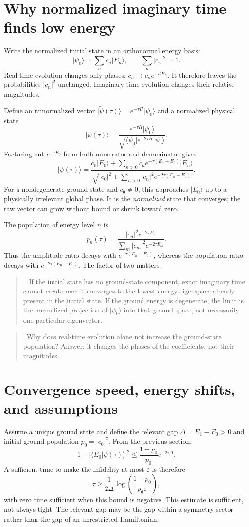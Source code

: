 \documentclass[11pt,a4paper]{article}
\newcommand{\ket}[1]{\lvert #1\rangle}
\newcommand{\bra}[1]{\langle #1\rvert}
\newcommand{\braket}[2]{\langle #1\vert #2\rangle}
\newcommand{\lesson}[2]{\clearpage\section{#1}\label{#2}}
\newenvironment{idea}[1][Main idea]{\par\smallskip\begin{quotation}\noindent{\bfseries\textcolor{keyblue}{#1.}}\ }{\end{quotation}\smallskip}
\newenvironment{caution}[1][Important distinction]{\par\smallskip\begin{quotation}\noindent{\bfseries\textcolor{alertred}{#1.}}\ }{\end{quotation}\smallskip}
\newcommand{\checkpoint}[1]{\begin{idea}[Pause and check]#1\end{idea}}
\begin{document}
\lesson{Why normalized imaginary time finds low energy}{sec:filter}
Write the normalized initial state in an orthonormal energy basis:
\[
\ket{\psi_0}=\sum_n c_n\ket{E_n},\qquad \sum_n|c_n|^2=1.
\]
Real-time evolution changes only phases: $c_n\mapsto c_ne^{-itE_n}$. It therefore leaves the probabilities $|c_n|^2$ unchanged. Imaginary-time evolution changes their relative magnitudes.

Define an unnormalized vector $\ket{\widetilde\psi(\tau)}=e^{-\tau H}\ket{\psi_0}$ and a normalized physical state
\begin{equation}
\boxed{\ket{\psi(\tau)}=
\frac{e^{-\tau H}\ket{\psi_0}}
{\sqrt{\bra{\psi_0}e^{-2\tau H}\ket{\psi_0}}}.}
\label{eq:normalized}
\end{equation}
Factoring out $e^{-\tau E_0}$ from both numerator and denominator gives
\[
\ket{\psi(\tau)}=
\frac{c_0\ket{E_0}+\sum_{n>0}c_ne^{-\tau(E_n-E_0)}\ket{E_n}}
{\sqrt{|c_0|^2+\sum_{n>0}|c_n|^2e^{-2\tau(E_n-E_0)}}}.
\]
For a nondegenerate ground state and $c_0\ne0$, this approaches $\ket{E_0}$ up to a physically irrelevant global phase. It is the \emph{normalized} state that converges; the raw vector can grow without bound or shrink toward zero.

The population of energy level $n$ is
\[
p_n(\tau)=\frac{|c_n|^2e^{-2\tau E_n}}{\sum_m |c_m|^2e^{-2\tau E_m}}.
\]
Thus the amplitude ratio decays with $e^{-\tau(E_n-E_0)}$, whereas the population ratio decays with $e^{-2\tau(E_n-E_0)}$. The factor of two matters.

\begin{caution}[Overlap and degeneracy]
If the initial state has no ground-state component, exact imaginary time cannot create one: it converges to the lowest-energy eigenspace already present in the initial state. If the ground energy is degenerate, the limit is the normalized projection of $\ket{\psi_0}$ into that ground space, not necessarily one particular eigenvector.
\end{caution}

\checkpoint{Why does real-time evolution alone not increase the ground-state population? Answer: it changes the phases of the coefficients, not their magnitudes.}

\lesson{Convergence speed, energy shifts, and assumptions}{sec:gap}
Assume a unique ground state and define the relevant gap $\Delta=E_1-E_0>0$ and initial ground population $p_0=|c_0|^2$. From the previous section,
\[
1-|\braket{E_0}{\psi(\tau)}|^2
\le \frac{1-p_0}{p_0}e^{-2\tau\Delta}.
\]
A sufficient time to make the infidelity at most $\varepsilon$ is therefore
\[
\tau\ge\frac{1}{2\Delta}
\log\!\left(\frac{1-p_0}{p_0\varepsilon}\right),
\]
with zero time sufficient when this bound is negative. This estimate is sufficient, not always tight. The relevant gap may be the gap within a symmetry sector rather than the gap of an unrestricted Hamiltonian.
\end{document}
